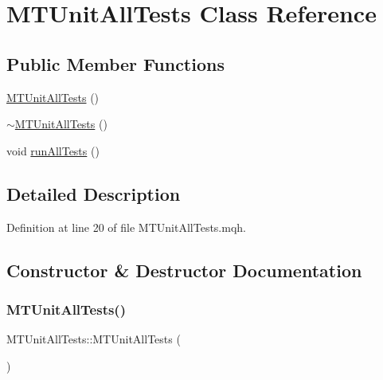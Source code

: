 \hypertarget{class_m_t_unit_all_tests}{}\section{M\+T\+Unit\+All\+Tests Class Reference}
\label{class_m_t_unit_all_tests}
\subsection*{Public Member Functions}
\begin{DoxyCompactItemize}
\item 
\mbox{\hyperlink{class_m_t_unit_all_tests_a77411abf2fe3fcee948cb82357acb722}{M\+T\+Unit\+All\+Tests}} ()
\item 
\mbox{\hyperlink{class_m_t_unit_all_tests_a2d9dccb31b2ce7cd3dc164c0c9c79c8c}{$\sim$\+M\+T\+Unit\+All\+Tests}} ()
\item 
void \mbox{\hyperlink{class_m_t_unit_all_tests_acb555e1d5ff6afa8a5fdbf097abe70f5}{run\+All\+Tests}} ()
\end{DoxyCompactItemize}


\subsection{Detailed Description}


Definition at line 20 of file M\+T\+Unit\+All\+Tests.\+mqh.



\subsection{Constructor \& Destructor Documentation}
\mbox{\label{class_m_t_unit_all_tests_a77411abf2fe3fcee948cb82357acb722}} 
\subsubsection{\texorpdfstring{M\+T\+Unit\+All\+Tests()}{MTUnitAllTests()}}
{\footnotesize\ttfamily M\+T\+Unit\+All\+Tests\+::\+M\+T\+Unit\+All\+Tests (\begin{DoxyParamCaption}{ }\end{DoxyParamCaption})\hspace{0.3cm}{\ttfamily [inline]}}



